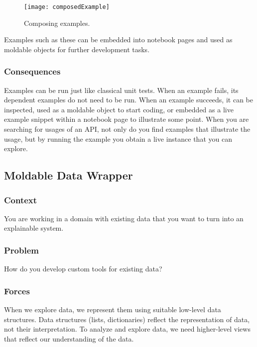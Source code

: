 \documentclass[sigconf]{acmart}
\begin{document}
\begin{figure}[h]
  \texttt{[image: composedExample]}
  \caption{Composing examples.}
  \label{fig:composedExample}
\end{figure}

Examples such as these can be embedded into notebook pages and used as moldable objects for further development tasks.
    
\subsubsection*{Consequences}
Examples can be run just like classical unit tests.
When an example fails, its dependent examples do not need to be run.
When an example succeeds, it can be inspected, used as a moldable object to start coding, or embedded as a live example snippet within a notebook page to illustrate some point.
When you are searching for usages of an API, not only do you find examples that illustrate the usage, but by running the example you obtain a live instance that you can explore.

\subsection*{Moldable Data Wrapper}\label{pat:moldableDataWrapper}
\subsubsection*{Context}
You are working in a domain with existing data that you want to turn into an explainable system.

\subsubsection*{Problem}
How do you develop custom tools for existing data?

\subsubsection*{Forces}
When we explore data, we represent them using suitable low-level data structures.
Data structures (lists, dictionaries) reflect the representation of data, not their interpretation.
To analyze and explore data, we need higher-level views that reflect our understanding of the data.
\end{document}
